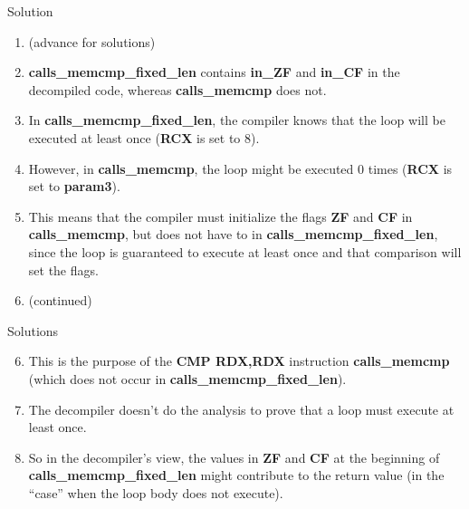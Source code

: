 \documentclass{beamer}
\begin{document}
\begin{frame}
\begin{block}{Solution}
\begin{enumerate}
\item[] (advance for solutions)
\pause 
\item \textbf{calls\_memcmp\_fixed\_len} contains \textbf{in\_ZF} and \textbf{in\_CF} in the decompiled code, whereas \textbf{calls\_memcmp} does not.
\item In \textbf{calls\_memcmp\_fixed\_len}, the compiler knows that the loop will be executed at least once (\textbf{RCX} is set to 8).
\item However, in \textbf{calls\_memcmp}, the loop might be executed 0 times (\textbf{RCX} is set to \textbf{param3}).
\item This means that the compiler must initialize the flags \textbf{ZF} and \textbf{CF} in \textbf{calls\_memcmp}, but does not have to in \textbf{calls\_memcmp\_fixed\_len}, since
the loop is guaranteed to execute at least once and that comparison will set the flags. 
\item[] (continued)
\end{enumerate}
\end{block}
\end{frame}

\begin{frame}
\begin{block}{Solutions}
\begin{enumerate}
\setcounter{enumi}{5}
\item This is the purpose of the \textbf{CMP RDX,RDX} instruction \textbf{calls\_memcmp} (which does not occur in \textbf{calls\_memcmp\_fixed\_len}).
\item The decompiler doesn't do the analysis to prove that a loop must execute at least once.
\item So in the decompiler's view, the values in \textbf{ZF} and \textbf{CF} at the beginning of \textbf{calls\_memcmp\_fixed\_len} might contribute to the return value (in the ``case''
 when the loop body does not execute).
\end{enumerate}
\end{block}
\end{frame}
\end{document}
